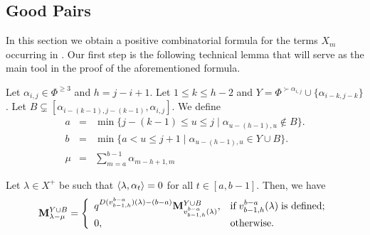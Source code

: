 \subsection{Good Pairs} \label{section: good pairs}
In this section we obtain a positive combinatorial formula for the terms $X_m$ occurring in   . 
Our first step is the following technical lemma that will serve as the main tool in the proof of the aforementioned formula.


\begin{lemma}\label{lem: lamda - alpha  a v}
    Let  $\alpha_{i,j}\in \Phi^{\geq 3}$  and $h=j-i+1$. Let $1\leq k \leq h-2$ and $Y=\Phi^{\succ \alpha_{i,j} } \cup \{ \alpha_{i-k,j-k} \}$.
    Let  $B\subsetneq [\alpha_{i-(k-1),j-(k-1)},\alpha_{i,j}]$.
    We define
    \begin{equation} \label{eq: defin a ,b , mu}
    \begin{array}{lll}
       a  & = & \min   \{  j-(k-1)\leq u \leq j  \mid \alpha_{u-(h-1),u} \notin B \}. \\[5pt]
       b  & = & \min \{  a<  u \leq j+1  \mid  \alpha_{u-(h-1), u} \in Y\cup B \}.\\[3pt]
       \mu& = & \displaystyle\sum_{m=a}^{b-1} \alpha_{m-h+1,m}
    \end{array}
    \end{equation}
    
    Let $\lambda \in X^{+}$ be such that  $\langle \lambda , \alpha_{t} \rangle =0$ for all $t\in [a,b-1]$.
    Then, we have
    \begin{equation}\label{eq: alpha a v}
        \mathbf{M}_{\lambda - \mu}^{Y\cup B} = \left\{\begin{array}{ll}
            q^{D(v^{b-a}_{b-1,h})(\lambda) - (b-a)}\mathbf{M}_{v^{b-a}_{b-1,h}(\lambda)}^{Y\cup B}, & \text{if}\; v^{b-a}_{b-1,h}(\lambda) \;\text{is defined}; \\[5pt]
            0, & \text{otherwise.}
        \end{array}\right.
    \end{equation}
\end{lemma}


